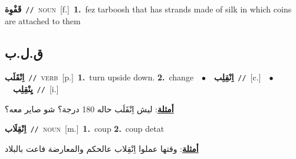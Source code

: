 \documentclass[10pt,a4paper,twoside]{article} %
\begin{document}
\begin{multicols}{2}
{\setlength\topsep{0pt}\textbf{\foreignlanguage{arabic}{قَفْوِة}}\ {\color{gray}\texttt{//}\color{black}}\ \textsc{noun}\ [f.]\ \textbf{1.}~fez tarboosh that has strands made of silk in which coins are attached to them\ } \vspace{2mm}

\vspace{-3mm}
\subsection*{\color{blue}\foreignlanguage{arabic}{ق.ل.ب}\color{blue}{}} 

{\setlength\topsep{0pt}\textbf{\foreignlanguage{arabic}{اِنْقَلَب}}\ {\color{gray}\texttt{//}\color{black}}\ \textsc{verb}\ [p.]\ \textbf{1.}~turn upside down.  \textbf{2.}~change\ \ $\bullet$\ \ \setlength\topsep{0pt}\textbf{\foreignlanguage{arabic}{اِنْقِلِب}}\ {\color{gray}\texttt{//}\color{black}}\ [c.]\ \ $\bullet$\ \ \setlength\topsep{0pt}\textbf{\foreignlanguage{arabic}{يِنْقِلِب}}\ {\color{gray}\texttt{//}\color{black}}\ [i.]\  \begin{flushright}\color{gray}\foreignlanguage{arabic}{\textbf{\underline{\foreignlanguage{arabic}{أمثلة}}}: ليش اِنْقَلَب حاله 180 درجة؟ شو صاير معه؟}\end{flushright}\color{black}} \vspace{2mm}

{\setlength\topsep{0pt}\textbf{\foreignlanguage{arabic}{اِنْقِلَاب}}\ {\color{gray}\texttt{//}\color{black}}\ \textsc{noun}\ [m.]\ \textbf{1.}~coup  \textbf{2.}~coup detat\  \begin{flushright}\color{gray}\foreignlanguage{arabic}{\textbf{\underline{\foreignlanguage{arabic}{أمثلة}}}: وقتها عملوا اِنْقِلاب عالحكم والمعارضة فاعت بالبلاد}\end{flushright}\color{black}} \vspace{2mm}


\end{multicols}
\end{document}
